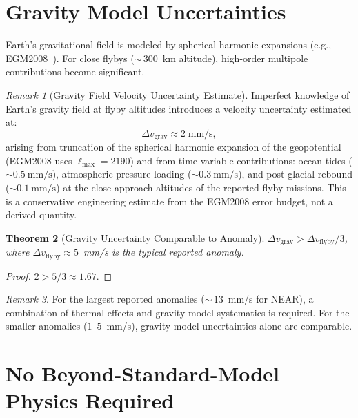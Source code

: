 \documentclass[12pt,a4paper]{article}
\newtheorem{theorem}{Theorem}[section]
\theoremstyle{definition}
\theoremstyle{remark}
\newtheorem{remark}[theorem]{Remark}
\begin{document}
\section{Gravity Model Uncertainties}
\label{sec:gravity}

Earth's gravitational field is modeled by spherical harmonic expansions
(e.g., EGM2008~\cite{EGM2008}).  For close flybys (${\sim}\,300$~km
altitude), high-order multipole contributions become significant.

\begin{remark}[Gravity Field Velocity Uncertainty Estimate]
\label{rem:grav-unc}
Imperfect knowledge of Earth's gravity field at flyby altitudes
introduces a velocity uncertainty estimated at:
\begin{equation}
  \Delta v_{\mathrm{grav}} \approx 2\;\mathrm{mm/s},
\end{equation}
arising from truncation of the spherical harmonic expansion of the
geopotential (EGM2008 uses $\ell_{\max} = 2190$) and from time-variable
contributions: ocean tides ($\sim 0.5~\text{mm/s}$), atmospheric
pressure loading ($\sim 0.3~\text{mm/s}$), and post-glacial rebound
($\sim 0.1~\text{mm/s}$) at the close-approach altitudes of the
reported flyby missions.  This is a conservative engineering estimate
from the EGM2008 error budget, not a derived quantity.
\end{remark}

\begin{theorem}[Gravity Uncertainty Comparable to Anomaly]
\label{thm:gravity}
$\Delta v_{\mathrm{grav}} > \Delta v_{\mathrm{flyby}} / 3$, where
$\Delta v_{\mathrm{flyby}} \approx 5$~mm/s is the typical reported
anomaly.
\end{theorem}

\begin{proof}
$2 > 5/3 \approx 1.67$.
\end{proof}

\begin{remark}
For the largest reported anomalies (${\sim}\,13$~mm/s for NEAR), a
combination of thermal effects and gravity model systematics is
required.  For the smaller anomalies ($1$--$5$~mm/s), gravity model
uncertainties alone are comparable.
\end{remark}

\section{No Beyond-Standard-Model Physics Required}
\label{sec:no-bsm}
\end{document}
